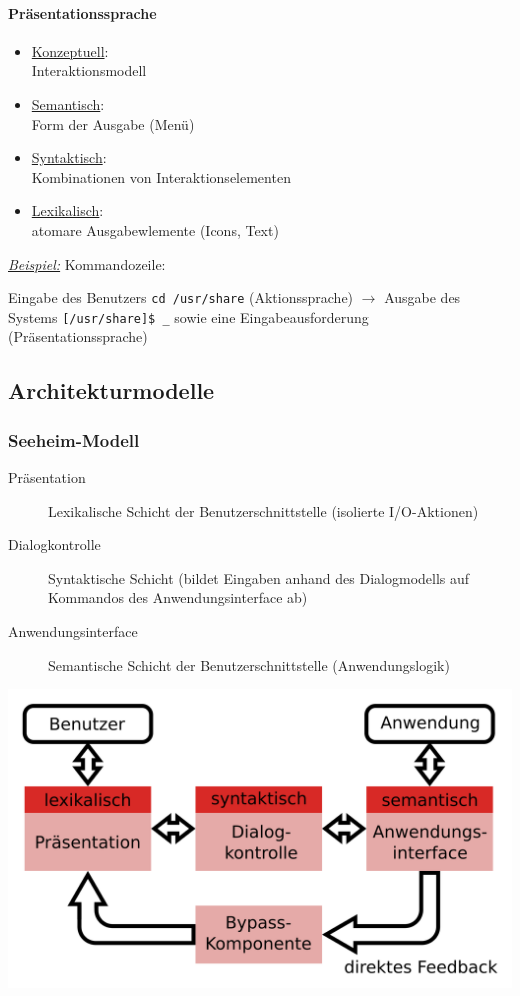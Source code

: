\documentclass[8pt,a4paper,landscape]{extarticle}
\newcommand{\example}{\textit{\underline{Beispiel:} }}
\begin{document}
\begin{multicols*}{4}
\begin{center}
\begin{minipage}{0.49\linewidth}
			\paragraph{Präsentationssprache}
			\begin{itemize}
				\item \underline{Konzeptuell}:\\
				      Interaktionsmodell
				\item \underline{Semantisch}:\\
				      Form der Ausgabe (Menü)
				\item \underline{Syntaktisch}:\\
				      Kombinationen von Interaktionselementen
				\item \underline{Lexikalisch}:\\
				      atomare Ausgabewlemente (Icons, Text)
			\end{itemize}
		\end{minipage}
	\end{center}
	\example Kommandozeile: \par
	Eingabe des Benutzers \texttt{cd /usr/share} (Aktionssprache) \(\rightarrow\)
	Ausgabe des Systems \texttt{[/usr/share]\$ \_} sowie eine
	Eingabeausforderung (Präsentationssprache)
	\subsection{Architekturmodelle}
	\subsubsection{Seeheim-Modell}
	\begin{description}
		\item[Präsentation] Lexikalische Schicht der Benutzerschnittstelle
		      (isolierte I/O-Aktionen)
		\item[Dialogkontrolle] Syntaktische Schicht (bildet Eingaben anhand des
		      Dialogmodells auf Kommandos des Anwendungsinterface ab)
		\item[Anwendungsinterface] Semantische Schicht der Benutzerschnittstelle
		      (Anwendungslogik)
	\end{description}
	\begin{center}
		\includegraphics[width=0.7\linewidth]{./pictures/figure_04.png}
	\end{center}

\end{multicols*}
\end{document}
